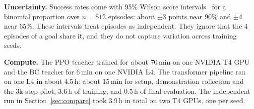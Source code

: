 \textbf{Uncertainty.} Success rates come with 95\% Wilson score intervals~\cite{wilson1927probable} for a binomial proportion over
$n = 512$ episodes: about $\pm 3$ points near 90\% and $\pm 4$ near 65\%. These intervals treat episodes as independent. They ignore
that the 4 episodes of a goal share it, and they do not capture variation across training seeds.

\textbf{Compute.} The PPO teacher trained for about 70\,min on one NVIDIA T4 GPU and the BC teacher for 6\,min on one NVIDIA L4.
The transformer pipeline ran on one L4 in about 4.5\,h: about 15\,min for setup, demonstration collection and the 3k-step pilot,
3.6\,h of training, and 0.5\,h of final evaluation. The independent run in Section~\ref{sec:compare} took 3.9\,h in total on two T4
GPUs, one per seed.

